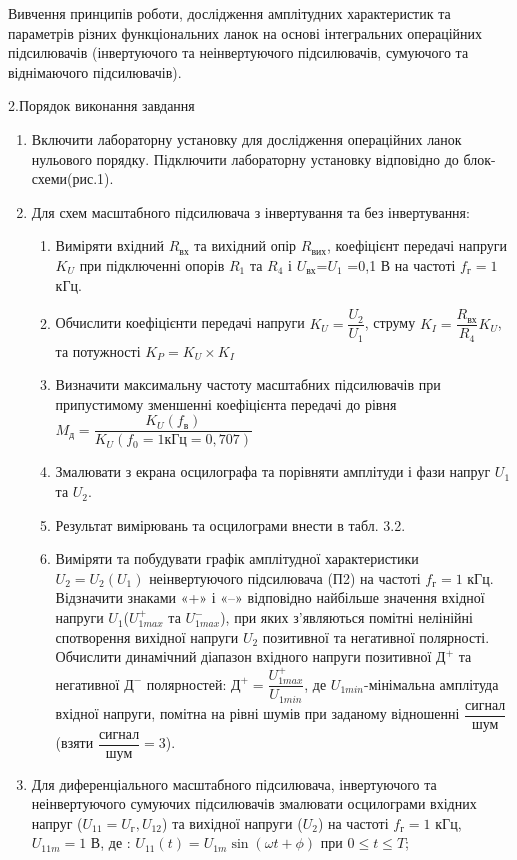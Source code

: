 \documentclass[14pt,a4paper]{scrartcl}
\begin{document}
Вивчення принципів роботи, дослідження амплітудних
характеристик та параметрів різних функціональних ланок на основі
інтегральних операційних підсилювачів (інвертуючого та неінвертуючого
підсилювачів, сумуючого та віднімаючого підсилювачів).

\begin{center}
{\Large 2.Порядок виконання завдання}
\end{center}

\begin{enumerate}
\item Включити лабораторну установку для дослідження
операційних ланок нульового порядку. Підключити лабораторну установку
відповідно до блок-схеми(рис.1).
\item Для схем масштабного підсилювача з інвертування та без
інвертування:
\begin{enumerate}
\item Виміряти вхідний $R_{\text{вх}}$ та вихідний опір $R_{\text{вих}}$, коефіцієнт
передачі напруги $K_U$ при підключенні опорів $R_1$ та $R_4$ і
$U_{\text{вх}}$=$U_1$ =0,1 В на частоті $f_{\text{г}}=1$ кГц.

\item Обчислити коефіцієнти передачі напруги $K_U=\dfrac{U_2}{U_1}$, струму $K_I=\dfrac{R_{\text{вх}}}{R_4}K_U$, та потужності $K_P=K_U\times{K_I}$
\item Визначити максимальну частоту масштабних підсилювачів при припустимому зменшенні коефіцієнта передачі до рівня \\
$M_{\text{д}}=\dfrac{K_U(f_{\text{в}})}{K_U(f_0=1 \text{кГц}=0,707)}$
\item Змалювати з екрана осцилографа та порівняти амплітуди
і фази напруг $U_1$ та $U_2$.
\item Результат вимірювань та осцилограми внести в табл. 3.2.
\item Виміряти та побудувати графік амплітудної характеристики $U_2 =U_2 (U_1)$
неінвертуючого підсилювача (П2) на частоті $f_{\text{г}}=1$ кГц. Відзначити знаками «+» і «–» відповідно найбільше значення вхідної напруги $U_1$($U_{1max}^+$ та $U_{1max}^-$), при яких з'являються помітні нелінійні спотворення вихідної напруги $U_2$
позитивної та негативної полярності. Обчислити динамічний діапазон вхідного напруги позитивної $\text{Д}^+$ та негативної $\text{Д}^-$ полярностей:
$\text{Д}^+=\dfrac{U_{1max}^+}{U_{1min}}$, де $U_{1min}$-мінімальна амплітуда вхідної напруги, помітна на рівні шумів при заданому відношенні 
$\dfrac{\text{сигнал}}{\text{шум}}$(взяти $\dfrac{\text{сигнал}}{\text{шум}}=3$).
\end{enumerate}
\item Для диференціального масштабного підсилювача, інвертуючого та неінвертуючого сумуючих підсилювачів змалювати осцилограми вхідних напруг ($U_{11}=U_{\text{г}}, U_{12}$) та вихідної напруги ($U_2$) на частоті $f_{\text{г}}=1$ кГц, $U_{11m}=1$ В, де : $U_{11}(t)=U_{1m}\sin(\omega t+\phi)$ при $0\le t\le T$;\\


\end{enumerate}
\end{document}
